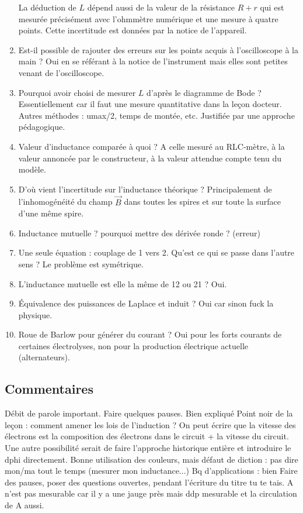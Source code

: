 \begin{enumerate}
La déduction de $L$ dépend aussi de la valeur de la résistance $R + r$ qui est mesurée précisément avec l'ohmmètre numérique et une mesure à quatre points.
Cette incertitude est données par la notice de l'appareil.
\item Est-il possible de rajouter des erreurs sur les points acquis à l'oscilloscope à la main ?
Oui en se référant à la notice de l'instrument mais elles sont petites venant de l'oscilloscope.
\item Pourquoi avoir choisi de mesurer $L$ d'après le diagramme de Bode ?
Essentiellement car il faut une mesure quantitative dans la leçon docteur.
Autres méthodes : umax/2, temps de montée, etc.
Justifiée par une approche pédagogique.
\item Valeur d'inductance comparée à quoi ? A celle mesuré au RLC-mètre, à la valeur annoncée par le constructeur, à la valeur attendue compte tenu du modèle.
\item D'où vient l'incertitude sur l'inductance théorique ? Principalement de l'inhomogénéité du champ $\overrightarrow{B}$ dans toutes les spires et sur toute la surface d'une même spire.
\item Inductance mutuelle ? pourquoi mettre des dérivée ronde ? (erreur)
\item Une seule équation : couplage de 1 vers 2. Qu'est ce qui se passe dans l'autre sens ?
Le problème est symétrique.
\item L'inductance mutuelle est elle la même de 12 ou 21 ? Oui.
\item Équivalence des puissances de Laplace et induit ? Oui car sinon fuck la physique.
\item Roue de Barlow pour générer du courant ? Oui pour les forts courants de certaines électrolyses, non pour la production électrique actuelle (alternateurs).
\end{enumerate}

\subsection{Commentaires}

Débit de parole important. Faire quelques pauses.
Bien expliqué
Point noir de la leçon : comment amener les lois de l'induction ?
On peut écrire que la vitesse des électrons est la composition des électrons dans le circuit + la vitesse du circuit.
Une autre possibilité serait de faire l'approche historique entière et introduire le dphi directement.
Bonne utilisation des couleurs, mais défaut de diction : pas dire mon/ma tout le temps (mesurer mon inductance...)
Bq d'applications : bien
Faire des pauses, poser des questions ouvertes, pendant l'écriture du titre tu te tais.
A n'est pas mesurable car il y a une jauge près mais ddp mesurable et la circulation de A aussi.